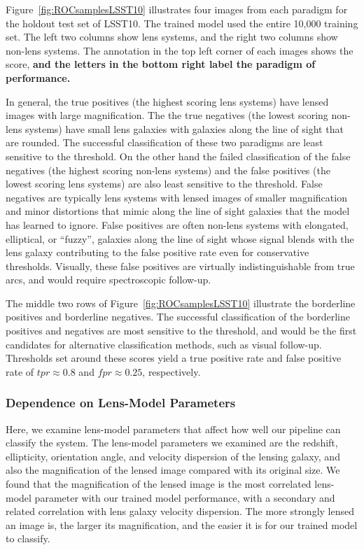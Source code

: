 \documentclass{emulateapj}
\newcommand{\todo}[1]{{\bf\color{blue} #1}}
\begin{document}
Figure~\ref{fig:ROCsamplesLSST10} illustrates four images from each
paradigm for the holdout test set of LSST10.  The trained model used
the entire 10,000 training set.  The left two columns show lens
systems, and the right two columns show non-lens systems.  The
annotation in the top left corner of each images shows the score,
\todo{and the letters in the bottom right label the paradigm of
  performance.}

In general, the true positives (the highest scoring lens systems) have
lensed images with large magnification.  The the true negatives (the
lowest scoring non-lens systems) have small lens galaxies with
galaxies along the line of sight that are rounded.  The successful
classification of these two paradigms are least sensitive to the
threshold.  On the other hand the failed classification of the false
negatives (the highest scoring non-lens systems) and the false
positives (the lowest scoring lens systems) are also least sensitive
to the threshold.  False negatives are typically lens systems with
lensed images of smaller magnification and minor distortions that
mimic along the line of sight galaxies that the model has learned to
ignore.  False positives are often non-lens systems with elongated,
elliptical, or ``fuzzy'', galaxies along the line of sight whose signal
blends with the lens galaxy contributing to the false positive rate
even for conservative thresholds.  Visually, these false positives are
virtually indistinguishable from true arcs, and would require
spectroscopic follow-up.

The middle two rows of Figure~\ref{fig:ROCsamplesLSST10} illustrate
the borderline positives and borderline negatives. The successful
classification of the borderline positives and negatives are most
sensitive to the threshold, and would be the first candidates for
alternative classification methods, such as visual follow-up.
Thresholds set around these scores yield a true positive rate and
false positive rate of $tpr\approx0.8$ and $fpr\approx0.25$,
respectively.

\subsubsection{Dependence on Lens-Model Parameters}

Here, we examine lens-model parameters that affect how well our
pipeline can classify the system.  The lens-model parameters we
examined are the redshift, ellipticity, orientation angle, and
velocity dispersion of the lensing galaxy, and also the magnification
of the lensed image compared with its original size.  We found that
the magnification of the lensed image is the most correlated
lens-model parameter with our trained model performance, with a
secondary and related correlation with lens galaxy velocity
dispersion.  The more strongly lensed an image is, the larger its
magnification, and the easier it is for our trained model to classify.
\end{document}
